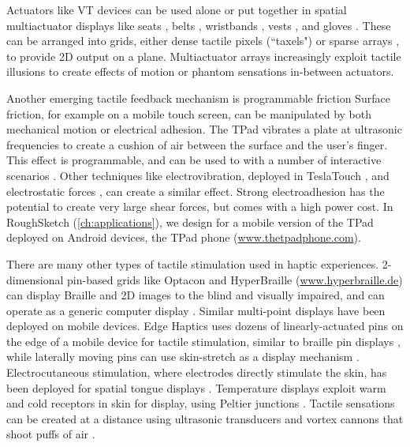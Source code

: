 Actuators like VT devices can be used alone or put together in spatial multiactuator displays like seats \cite{Israr2012,Israr2010}, belts \cite{Pielot2009,Paneels2013}, wristbands \cite{Arab2015,Paneels2013,Gupta2016}, vests \cite{Prasad2014,Jones2004}, and gloves \cite{Park2016,Kim2009}.
These can be arranged into grids, either dense tactile pixels (``taxels") \cite{Kim2009} or sparse arrays \cite{Israr2012,Israr2010}, to provide 2D output on a plane.
Multiactuator arrays increasingly exploit tactile illusions to create effects of motion or phantom sensations in-between actuators.

Another emerging tactile feedback mechanism is programmable friction
Surface friction, for example on a mobile touch screen, can be manipulated by both mechanical motion or electrical adhesion.
The TPad \cite{Winfield2007} vibrates a plate at ultrasonic frequencies to create a cushion of air between the surface and the user's finger.
This effect is programmable, and can be used to with a number of interactive scenarios \cite{Levesque2011}.
Other techniques like electrovibration, deployed in TeslaTouch \cite{Bau2010}, and electrostatic forces \cite{Meyer2013}, can create a similar effect.
Strong electroadhesion \cite{Shultz2015} has the potential to create very large shear forces, but comes with a high power cost.
In RoughSketch (\autoref{ch:applications}), we design for a mobile version of the TPad deployed on Android devices, the TPad phone (\url{www.thetpadphone.com}).

There are many other types of tactile stimulation used in haptic experiences.
2-dimensional pin-based grids like Optacon \cite{Bliss1970} and HyperBraille (\url{www.hyperbraille.de}) can display Braille and 2D images to the blind and visually impaired, and can operate as a generic computer display \cite{Prescher2010}. 
Similar multi-point displays have been deployed on mobile devices.
Edge Haptics uses dozens of linearly-actuated pins on the edge of a mobile device for tactile stimulation, similar to braille pin displays \cite{Jang2016}, while laterally moving pins can use skin-stretch as a display mechanism \cite{Luk2006}.
Electrocutaneous stimulation, where electrodes directly stimulate the skin, has been deployed for spatial tongue displays \cite{Bach-y-Rita1998}.
Temperature displays exploit warm and cold receptors in  skin for display, using Peltier junctions \cite{Jones2002}.
Tactile sensations can be created at a distance using ultrasonic transducers \cite{Obrist2013,Carter2013} and vortex cannons that shoot puffs of air \cite{Sodhi2013}.



